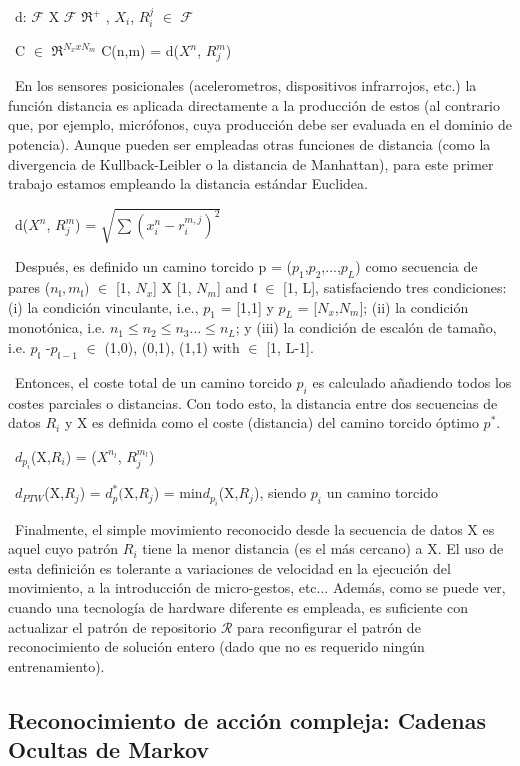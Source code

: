 \ d: $\mathcal{F}$ X $\mathcal{F}$  \longrightarrow $\mathfrak{R}^+$   ,    $X_i$, $R_i^j$ $\in$ $\mathcal{F}$

\ C $\in$ $\mathfrak{R}^{N_x x N_m}$  C(n,m) = d($X^n$, $R^m_j$)

\ En los sensores posicionales (acelerometros, dispositivos infrarrojos, etc.) la función distancia es aplicada directamente a la producción de estos (al contrario que, por ejemplo, micrófonos, cuya producción debe ser evaluada en el dominio de potencia). Aunque pueden ser empleadas otras funciones de distancia (como la divergencia de Kullback-Leibler o la distancia de Manhattan), para este primer trabajo estamos empleando la distancia estándar Euclidea.

\ d($X^n$, $R_j^m$) = $\sqrt{
\sum(x_i^n - r_i^{m,j})^2}$

\ Después, es definido un camino torcido  p = ($p_1$,$p_2$,...,$p_L$) como secuencia de pares ($n_\mathfrak{l}, m_\mathfrak{l})$ $\in$ [1, $N_x$] X [1, $N_m$] and $\mathfrak{l}$ $\in$ [1, L], satisfaciendo tres condiciones: (i) la condición vinculante, i.e., $p_1$ = [1,1] y $p_L$ = [$N_x$,$N_m$]; (ii) la condición monotónica, i.e. $n_1 \leq n_2  \leq n_3 ...  \leq n_L$; y (iii) la condición de escalón de tamaño, i.e. $p_\mathfrak{l}$ -$p_{\mathfrak{l}-1}$ $\in$ {(1,0), (0,1), (1,1)} with  $\in$ [1, L-1].

\ Entonces, el coste total de un camino torcido $p_i$ es calculado añadiendo todos los costes parciales o distancias. Con todo esto, la distancia entre dos secuencias de datos $R_i$ y X es definida como el coste (distancia) del camino torcido óptimo $p^*$.

\ $d_{p_i}$(X,$R_i$) = \sum($X^{n_l}$, $R_j^{m_l}$)

\ $d_{PTW}$(X,$R_j$) = $d_p^*($X,$R_j$) = min{$d_{p_i}$(X,$R_j$), siendo $p_i$ un camino torcido}

\ Finalmente, el simple movimiento reconocido desde la secuencia de datos X es aquel cuyo patrón $R_i$ tiene la menor distancia (es el más cercano) a X. El uso de esta definición es tolerante a variaciones de velocidad en la ejecución del movimiento, a la introducción de micro-gestos, etc... Además, como se puede ver, cuando una tecnología de hardware diferente es empleada, es suficiente con actualizar el patrón de repositorio $\mathcal{R}$ para reconfigurar el patrón de reconocimiento de solución entero (dado que no es requerido ningún entrenamiento).

\subsection{Reconocimiento de acción compleja: Cadenas Ocultas de Markov}

